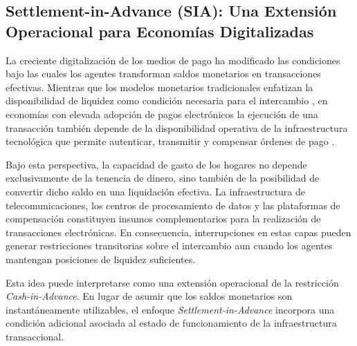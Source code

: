 \subsection{Settlement-in-Advance (SIA): Una Extensi\'on Operacional para Econom\'ias Digitalizadas}
\label{sec:2_2}

La creciente digitalizaci\'on de los medios de pago ha modificado las condiciones 
bajo las cuales los agentes transforman saldos monetarios en transacciones 
efectivas. Mientras que los modelos monetarios tradicionales enfatizan la 
disponibilidad de liquidez como condici\'on necesaria para el intercambio 
\citep{lucas1987money, woodford2003interest}, en econom\'ias con elevada adopci\'on de pagos 
electr\'onicos la ejecuci\'on de una transacci\'on tambi\'en depende de la 
disponibilidad operativa de la infraestructura tecnol\'ogica que permite 
autenticar, transmitir y compensar \'ordenes de pago \citep{kahn2009pay, auer2020technology}.

Bajo esta perspectiva, la capacidad de gasto de los hogares no depende 
exclusivamente de la tenencia de dinero, sino tambi\'en de la posibilidad de 
convertir dicho saldo en una liquidaci\'on efectiva. La infraestructura de 
telecomunicaciones, los centros de procesamiento de datos y las plataformas de 
compensaci\'on constituyen insumos complementarios para la realizaci\'on de 
transacciones electr\'onicas. En consecuencia, interrupciones en estas capas 
pueden generar restricciones transitorias sobre el intercambio aun cuando los 
agentes mantengan posiciones de liquidez suficientes.

Esta idea puede interpretarse como una extensi\'on operacional de la restricci\'on 
\textit{Cash-in-Advance}. En lugar de asumir que los saldos monetarios son 
instant\'aneamente utilizables, el enfoque \textit{Settlement-in-Advance} 
incorpora una condici\'on adicional asociada al estado de funcionamiento de la 
infraestructura transaccional.

